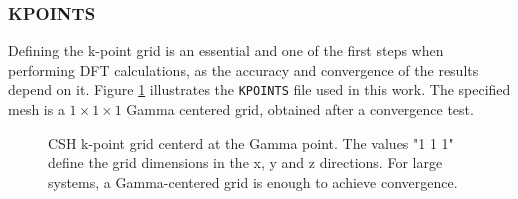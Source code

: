 \subsubsection{KPOINTS}
Defining the k-point grid is an essential and one of the first steps when performing DFT calculations, as the accuracy and convergence of the results depend on it. Figure \ref{kpoints} illustrates the \texttt{KPOINTS} file used in this work. The specified mesh is a $1\times 1\times 1$ Gamma centered grid, obtained after a convergence test. 
\begin{figure}[H]
	\centering
	\caption{CSH k-point grid centerd at the Gamma point. The values "1 1 1" define the grid dimensions in the x, y and z directions. For large systems, a Gamma-centered grid is enough to achieve convergence.}
	\label{kpoints}
\end{figure}


